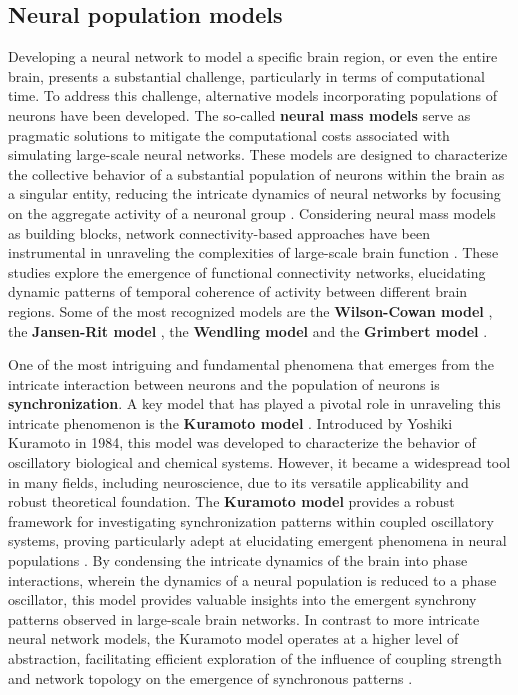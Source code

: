\documentclass[../main.tex]{subfiles}
\begin{document}
\subsection{Neural population models}
Developing a neural network to model a specific brain region, or even the entire brain, presents a substantial challenge, particularly in terms of computational time.
To address this challenge, alternative models incorporating populations of neurons have been developed.
The so-called \textbf{neural mass models} serve as pragmatic solutions to mitigate the computational costs associated with simulating large-scale neural networks.
These models are designed to characterize the collective behavior of a substantial population of neurons within the brain as a singular entity, reducing the intricate dynamics of neural networks by focusing on the aggregate activity of a neuronal group \citep{deschle_directed_2019}.
Considering neural mass models as building blocks, network connectivity-based approaches have been instrumental in unraveling the complexities of large-scale brain function \citep{10.3389/fams.2023.1128224,deco_key_2009, honey_network_2007}.
These studies explore the emergence of functional connectivity networks, elucidating dynamic patterns of temporal coherence of activity between different brain regions.
Some of the most recognized models are the \textbf{Wilson-Cowan model} \citep{wilson1973mathematical}, the \textbf{Jansen-Rit model} \citep{jansen1995electroencephalogram}, the \textbf{Wendling model} \cite{wendling2002epileptic} and the \textbf{Grimbert model} \citep{grimbert2006bifurcation}.

One of the most intriguing and fundamental phenomena that emerges from the intricate interaction between neurons and the population of neurons is \textbf{synchronization}.
A key model that has played a pivotal role in unraveling this intricate phenomenon is the \textbf{Kuramoto model} \citep{kuramoto1975international,kuramoto1984chemical}.
Introduced by Yoshiki Kuramoto in 1984, this model was developed to characterize the behavior of oscillatory biological and chemical systems.
However, it became a widespread tool in many fields, including neuroscience, due to its versatile applicability and robust theoretical foundation.
The \textbf{Kuramoto model} provides a robust framework for investigating synchronization patterns within coupled oscillatory systems, proving particularly adept at elucidating emergent phenomena in neural populations \citep{strogatz2000kuramoto,acebron2005kuramoto}.
By condensing the intricate dynamics of the brain into phase interactions, wherein the dynamics of a neural population is reduced to a phase oscillator, this model provides valuable insights into the emergent synchrony patterns observed in large-scale brain networks.
In contrast to more intricate neural network models, the Kuramoto model operates at a higher level of abstraction, facilitating efficient exploration of the influence of coupling strength and network topology on the emergence of synchronous patterns \citep{bick2020understanding,strogatz2000kuramoto,acebron2005kuramoto}.
\end{document}
